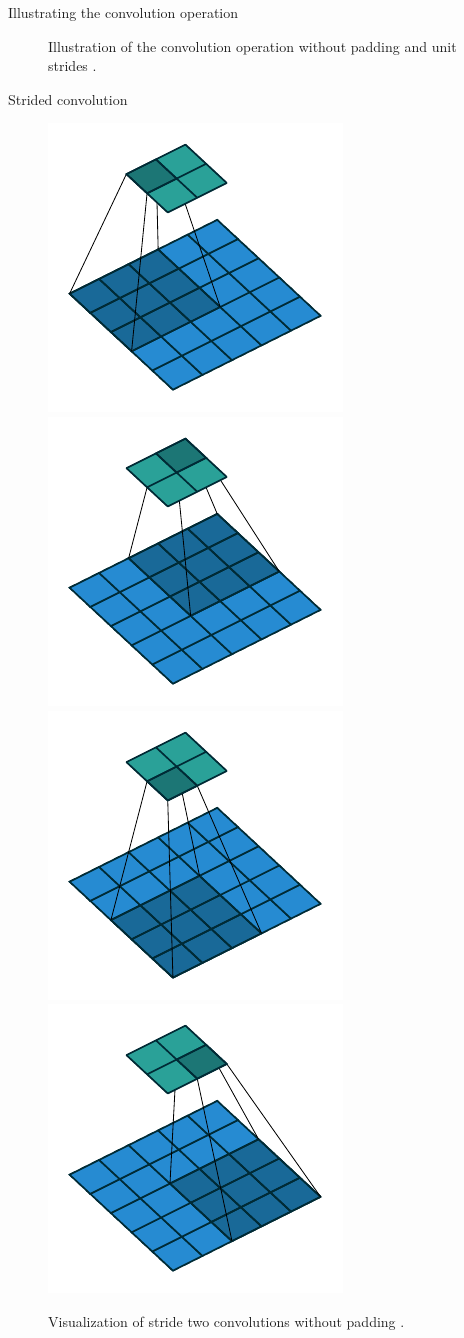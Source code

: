 \documentclass{beamer}
\begin{document}
\begin{frame}{Illustrating the convolution operation}
\begin{figure}
            \caption{Illustration of the convolution operation without padding and unit strides \cite{dumoulin2016guide}.}
        \end{figure}
    \end{frame}

    \begin{frame}{Strided convolution}
        \begin{figure}
            \centering
            \includegraphics[width=0.25\linewidth]{./figures/no_padding_strides_00.pdf}
            \includegraphics[width=0.25\linewidth]{./figures/no_padding_strides_01.pdf} \\
            \includegraphics[width=0.25\linewidth]{./figures/no_padding_strides_02.pdf}
            \includegraphics[width=0.25\linewidth]{./figures/no_padding_strides_03.pdf}
            \caption{Visualization of stride two convolutions without padding \cite{dumoulin2016guide}.}
        \end{figure}
    \end{frame}
\end{document}
